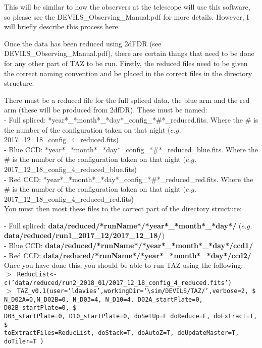 \documentclass[12pt]{article}
\begin{document}
This will be similar to how the observers at the telescope will use this software, so please see the DEVILS\_Observing\_Manual.pdf for more details. However,  I will briefly describe this process here. 

Once the data has been reduced using 2dFDR (see DEVILS\_Observing\_Manual.pdf), there are certain things that need to be done for any other part of TAZ to be run. Firstly, the reduced files need to be given the correct naming convention and be placed in the correct files in the directory structure.

There must be a reduced file for the full spliced data, the blue arm and the red arm (these will be produced from 2dfDR). These must be named:\\

- Full spliced:  *year*\_*month*\_*day*\_config\_*\#*\_reduced.fits. Where the \# is the number of the configuration taken on that night ($e.g.$ 2017\_12\_18\_config\_4\_reduced.fits)\\
- Blue CCD:  *year*\_*month*\_*day*\_config\_*\#*\_reduced\_blue.fits. Where the \# is the number of the configuration taken on that night ($e.g.$ 2017\_12\_18\_config\_4\_reduced\_blue.fits)\\
- Red CCD:  *year*\_*month*\_*day*\_config\_*\#*\_reduced\_red.fits. Where the \# is the number of the configuration taken on that night ($e.g.$ 2017\_12\_18\_config\_4\_reduced\_red.fits)\\

You must then most these files to the correct part of the directory structure:

- Full spliced: \textbf{data/reduced/*runName*/*year*\_*month*\_*day*/} ($e.g.$ \textbf{data/reduced/run1\_2017\_12/2017\_12\_18/}) \\
- Blue CCD: \textbf{data/reduced/*runName*/*year*\_*month*\_*day*/ccd1/} \\
- Red CCD: \textbf{data/reduced/*runName*/*year*\_*month*\_*day*/ccd2/}\\
 
 Once you have done this, you should be able to run TAZ using the following:\\
 
 
 \hspace{10mm} \texttt{$>$ ReducList<-c('data/reduced/run2\_2018\_01/2017\_12\_18\_config\_4\_reduced.fits')}\\
 
 \hspace{10mm} \texttt{$>$ TAZ\_v0.1(user=`ldavies',workingDir=`$\sim$/DEVILS/TAZ/',verbose=2, \$ \\
N\_D02A=0,N\_D02B=0, N\_D03=4, N\_D10=4, D02A\_startPlate=0, D02B\_startPlate=0, \$ \\ 
D03\_startPlate=0, D10\_startPlate=0, doSetUp=F doReduce=F, doExtract=T,  \$ \\
toExtractFiles=ReducList, doStack=T,  doAutoZ=T, doUpdateMaster=T, doTiler=T ) }\\
\end{document}
